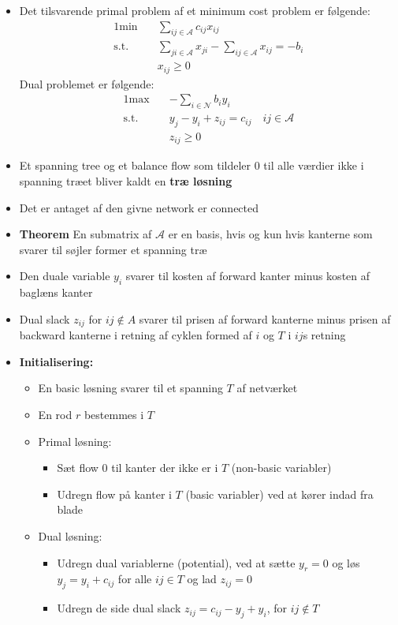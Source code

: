 \begin{itemize}
	\item Det tilsvarende primal problem af et minimum cost problem er følgende:
  \begin{alignat*}{1}
    \text{min} \quad  & \sum_{ij \in \mathcal A} c_{ij}x_{ij} \\
    \text{s.t.} \quad & \sum_{ji \in \mathcal A} x_{ji} - \sum_{ij \in \mathcal A} x_{ij} = -b_i \\
    & x_{ij} \geq 0
  \end{alignat*}
	Dual problemet er følgende:
  \begin{alignat*}{1}
    \text{max} \quad  & -\sum_{i \in \mathcal N} b_i y_i \\
    \text{s.t.} \quad & y_j - y_i + z_{ij} = c_{ij} \quad ij \in \mathcal A \\
                      & z_{ij} \geq 0
  \end{alignat*}
  \item Et spanning tree og et balance flow som tildeler 0 til alle værdier ikke i spanning træet bliver kaldt en \textbf{træ løsning}
  \item Det er antaget af den givne network er connected
  \item \textbf{Theorem} En submatrix af $\mathcal A$ er en basis, hvis og kun hvis kanterne som svarer til søjler former et spanning træ
  \item Den duale variable $y_i$ svarer til kosten af forward kanter minus kosten af baglæns kanter
  \item Dual slack $z_{ij}$ for $ij \notin A$ svarer til prisen af forward kanterne minus prisen af backward kanterne i retning af cyklen formed af $i$ og $T$ i $ij$s retning
  \item \textbf{Initialisering:} 
  \begin{itemize}
    \item En basic løsning svarer til et spanning $T$ af netværket
    \item En rod $r$ bestemmes i $T$ 
    \item Primal løsning:
    \begin{itemize}
    	\item Sæt flow $0$ til kanter der ikke er i $T$ (non-basic variabler)
      \item Udregn flow på kanter i $T$ (basic variabler) ved at kører indad fra blade
    \end{itemize}
    \item Dual løsning:
    \begin{itemize}
    	\item Udregn dual variablerne (potential), ved at sætte $y_r = 0$ og løs $y_j = y_i + c_{ij}$ for alle $ij \in T$ og lad $z_{ij} = 0$
      \item Udregn de side dual slack $z_{ij}=c_{ij} - y_j +y_i$, for $ij \notin T$ 
    \end{itemize}
  \end{itemize}


\end{itemize}
